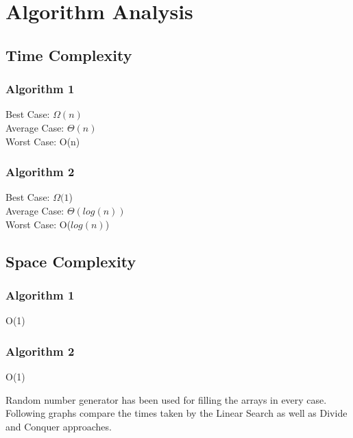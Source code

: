\documentclass[conference]{IEEEtran}
\begin{document}
\section{Algorithm Analysis}

\subsection{Time Complexity}
    \subsubsection{Algorithm 1}
        \begin{itemize}
            Best Case:  $ \Omega(n) $\\
            Average Case: $\Theta(n)$ \\
            Worst Case: O(n)\\
        \end{itemize}
    \subsubsection{Algorithm 2}
        \begin{itemize}
            Best Case:  $ \Omega(1$)\\
            Average Case: $ \Theta(log(n))$ \\
            Worst Case: O($log(n)$)\\
        \end{itemize}

\subsection{Space Complexity}
    \subsubsection{Algorithm 1}
        \begin{itemize}
            O(1)\\
        \end{itemize}
    \subsubsection{Algorithm 2}
        \begin{itemize}
            O(1)\\
        \end{itemize}

Random number generator has been used for filling the arrays in every case.
Following graphs compare the times taken by the Linear Search as well as Divide and Conquer approaches.
\end{document}
